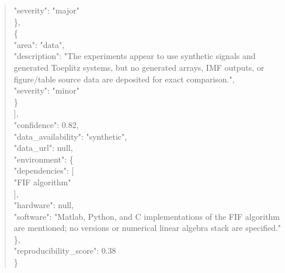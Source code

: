 \documentclass[11pt]{article}
\begin{document}
\begin{quote}
      "severity": "major"\\
    \},\\
    \{\\
      "area": "data",\\
      "description": "The experiments appear to use synthetic signals and generated Toeplitz systems, but no generated arrays, IMF outputs, or figure/table source data are deposited for exact comparison.",\\
      "severity": "minor"\\
    \}\\
  ],\\
  "confidence": 0.82,\\
  "data\_availability": "synthetic",\\
  "data\_url": null,\\
  "environment": \{\\
    "dependencies": [\\
      "FIF algorithm"\\
    ],\\
    "hardware": null,\\
    "software": "Matlab, Python, and C implementations of the FIF algorithm are mentioned; no versions or numerical linear algebra stack are specified."\\
  \},\\
  "reproducibility\_score": 0.38\\
\}\\
\end{quote}
\end{document}
